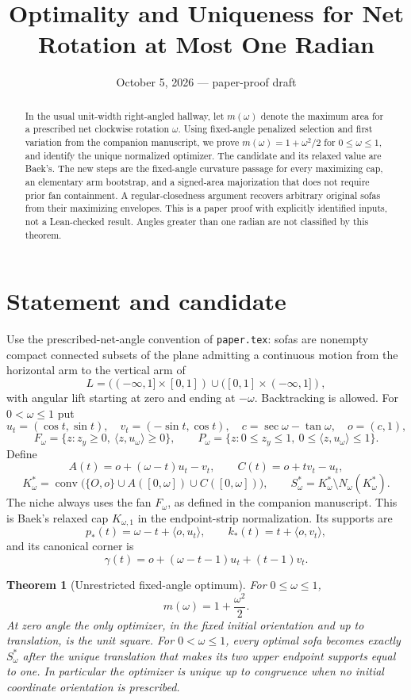 \documentclass[11pt]{article}
\title{Optimality and Uniqueness for Net Rotation at Most One Radian}
\author{}\date{October 5, 2026 --- paper-proof draft}
\newtheorem{theorem}{Theorem}[section]
\newcommand{\ip}[2]{\langle #1,#2\rangle}
\begin{document}
\maketitle
\begin{abstract}
In the usual unit-width right-angled hallway, let $m(\omega)$ denote the maximum area for a prescribed net clockwise rotation $\omega$. Using fixed-angle penalized selection and first variation from the companion manuscript, we prove $m(\omega)=1+\omega^2/2$ for $0\le\omega\le1$, and identify the unique normalized optimizer. The candidate and its relaxed value are Baek's. The new steps are the fixed-angle curvature passage for every maximizing cap, an elementary arm bootstrap, and a signed-area majorization that does not require prior fan containment. A regular-closedness argument recovers arbitrary original sofas from their maximizing envelopes. This is a paper proof with explicitly identified inputs, not a Lean-checked result. Angles greater than one radian are not classified by this theorem.
\end{abstract}

\section{Statement and candidate}
Use the prescribed-net-angle convention of \texttt{paper.tex}: sofas are nonempty compact connected subsets of the plane admitting a continuous motion from the horizontal arm to the vertical arm of
\[
 L=((-\infty,1]\times[0,1])\cup([0,1]\times(-\infty,1]),
\]
with angular lift starting at zero and ending at $-\omega$. Backtracking is allowed. For $0<\omega\le1$ put
\[
 u_t=(\cos t,\sin t),\quad v_t=(-\sin t,\cos t),\quad
 c=\sec\omega-\tan\omega,\quad o=(c,1),
\]
\[
 F_\omega=\{z:z_y\ge0,\ \ip z{u_\omega}\ge0\},\qquad
 P_\omega=\{z:0\le z_y\le1,\ 0\le\ip z{u_\omega}\le1\}.
\]
Define
\[
 A(t)=o+(\omega-t)u_t-v_t,\qquad C(t)=o+t v_t-u_t,
\]
\[
 K_\omega^*=\operatorname{conv}\bigl(\{O,o\}\cup A([0,\omega])\cup C([0,\omega])\bigr),
 \qquad S_\omega^*=K_\omega^*\setminus N_\omega(K_\omega^*).
\]
The niche always uses the fan $F_\omega$, as defined in the companion manuscript. This is Baek's relaxed cap $K_{\omega,1}$ in the endpoint-strip normalization. Its supports are
\[
 p_*(t)=\omega-t+\ip o{u_t},\qquad k_*(t)=t+\ip o{v_t},
\]
and its canonical corner is
\[
 \gamma(t)=o+(\omega-t-1)u_t+(t-1)v_t.
\]

\begin{theorem}[Unrestricted fixed-angle optimum]\label{thm:main}
For $0\le\omega\le1$,
\[
 \boxed{m(\omega)=1+\frac{\omega^2}{2}.}
\]
At zero angle the only optimizer, in the fixed initial orientation and up to translation, is the unit square. For $0<\omega\le1$, every optimal sofa becomes exactly $S_\omega^*$ after the unique translation that makes its two upper endpoint supports equal to one. In particular the optimizer is unique up to congruence when no initial coordinate orientation is prescribed.
\end{theorem}
\end{document}
